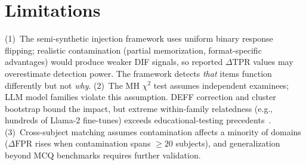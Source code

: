 \section*{Limitations}

(1)~The semi-synthetic injection framework uses uniform binary response flipping; realistic contamination (partial memorization, format-specific advantages) would produce weaker DIF signals, so reported $\Delta\mathrm{TPR}$ values may overestimate detection power. The framework detects \emph{that} items function differently but not \emph{why}. (2)~The MH $\chi^2$ test assumes independent examinees; LLM model families violate this assumption. DEFF correction and cluster bootstrap bound the impact, but extreme within-family relatedness (e.g., hundreds of Llama-2 fine-tunes) exceeds educational-testing precedents~\citep{french2010hierarchical}. (3)~Cross-subject matching assumes contamination affects a minority of domains ($\Delta\mathrm{FPR}$ rises when contamination spans ${\geq}20$ subjects), and generalization beyond MCQ benchmarks requires further validation.
